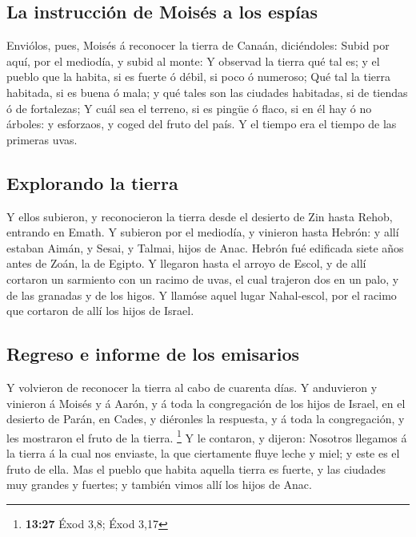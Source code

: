 \hypertarget{la-instrucciuxf3n-de-moisuxe9s-a-los-espuxedas}{%
\subsection{La instrucción de Moisés a los
espías}\label{la-instrucciuxf3n-de-moisuxe9s-a-los-espuxedas}}

 Enviólos, pues, Moisés á reconocer la tierra de Canaán,
diciéndoles: Subid por aquí, por el mediodía, y subid al monte:
 Y observad la tierra qué tal es; y el pueblo que la
habita, si es fuerte ó débil, si poco ó numeroso;  Qué tal
la tierra habitada, si es buena ó mala; y qué tales son las ciudades
habitadas, si de tiendas ó de fortalezas;  Y cuál sea el
terreno, si es pingüe ó flaco, si en él hay ó no árboles: y esforzaos, y
coged del fruto del país. Y el tiempo era el tiempo de las primeras
uvas.

\hypertarget{explorando-la-tierra}{%
\subsection{Explorando la tierra}\label{explorando-la-tierra}}

 Y ellos subieron, y reconocieron la tierra desde el
desierto de Zin hasta Rehob, entrando en Emath.  Y subieron
por el mediodía, y vinieron hasta Hebrón: y allí estaban Aimán, y Sesai,
y Talmai, hijos de Anac. Hebrón fué edificada siete años antes de Zoán,
la de Egipto.  Y llegaron hasta el arroyo de Escol, y de
allí cortaron un sarmiento con un racimo de uvas, el cual trajeron dos
en un palo, y de las granadas y de los higos.  Y llamóse
aquel lugar Nahal-escol, por el racimo que cortaron de allí los hijos de
Israel.

\hypertarget{regreso-e-informe-de-los-emisarios}{%
\subsection{Regreso e informe de los
emisarios}\label{regreso-e-informe-de-los-emisarios}}

 Y volvieron de reconocer la tierra al cabo de cuarenta
días.  Y anduvieron y vinieron á Moisés y á Aarón, y á toda
la congregación de los hijos de Israel, en el desierto de Parán, en
Cades, y diéronles la respuesta, y á toda la congregación, y les
mostraron el fruto de la tierra. \footnote{\textbf{13:27} Éxod 3,8; Éxod
  3,17}  Y le contaron, y dijeron: Nosotros llegamos á la
tierra á la cual nos enviaste, la que ciertamente fluye leche y miel; y
este es el fruto de ella.  Mas el pueblo que habita aquella
tierra es fuerte, y las ciudades muy grandes y fuertes; y también vimos
allí los hijos de Anac.

